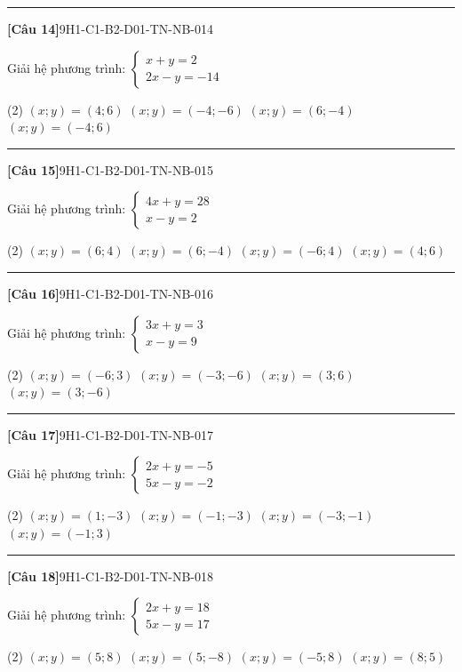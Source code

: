 \documentclass[12pt,a4paper]{article}
\newif\ifloigiai
\newenvironment{cauhoi}[2]{%
  \par\medskip\noindent\rule{\textwidth}{0.4pt}\par\nopagebreak
  \noindent\textbf{[#1]}\hfill{\scriptsize\ttfamily #2}\par\nopagebreak\smallskip}{\par}
\newcommand{\dapan}[1]{\ifloigiai\par\smallskip\noindent\textit{Đáp án:} \textbf{#1}\par\fi}
\begin{document}
\begin{cauhoi}{Câu 14}{9H1-C1-B2-D01-TN-NB-014}
Giải hệ phương trình: $\begin{cases}x + y=2\\ 2x - y=-14\end{cases}$
\begin{tasks}(2)
\task $(x;y)=(4;6)$
\task $(x;y)=(-4;-6)$
\task $(x;y)=(6;-4)$
\task $(x;y)=(-4;6)$
\end{tasks}
\dapan{D}
\end{cauhoi}
\begin{cauhoi}{Câu 15}{9H1-C1-B2-D01-TN-NB-015}
Giải hệ phương trình: $\begin{cases}4x + y=28\\ x - y=2\end{cases}$
\begin{tasks}(2)
\task $(x;y)=(6;4)$
\task $(x;y)=(6;-4)$
\task $(x;y)=(-6;4)$
\task $(x;y)=(4;6)$
\end{tasks}
\dapan{A}
\end{cauhoi}
\begin{cauhoi}{Câu 16}{9H1-C1-B2-D01-TN-NB-016}
Giải hệ phương trình: $\begin{cases}3x + y=3\\ x - y=9\end{cases}$
\begin{tasks}(2)
\task $(x;y)=(-6;3)$
\task $(x;y)=(-3;-6)$
\task $(x;y)=(3;6)$
\task $(x;y)=(3;-6)$
\end{tasks}
\dapan{D}
\end{cauhoi}
\begin{cauhoi}{Câu 17}{9H1-C1-B2-D01-TN-NB-017}
Giải hệ phương trình: $\begin{cases}2x + y=-5\\ 5x - y=-2\end{cases}$
\begin{tasks}(2)
\task $(x;y)=(1;-3)$
\task $(x;y)=(-1;-3)$
\task $(x;y)=(-3;-1)$
\task $(x;y)=(-1;3)$
\end{tasks}
\dapan{B}
\end{cauhoi}
\begin{cauhoi}{Câu 18}{9H1-C1-B2-D01-TN-NB-018}
Giải hệ phương trình: $\begin{cases}2x + y=18\\ 5x - y=17\end{cases}$
\begin{tasks}(2)
\task $(x;y)=(5;8)$
\task $(x;y)=(5;-8)$
\task $(x;y)=(-5;8)$
\task $(x;y)=(8;5)$
\end{tasks}
\dapan{A}
\end{cauhoi}
\end{document}
